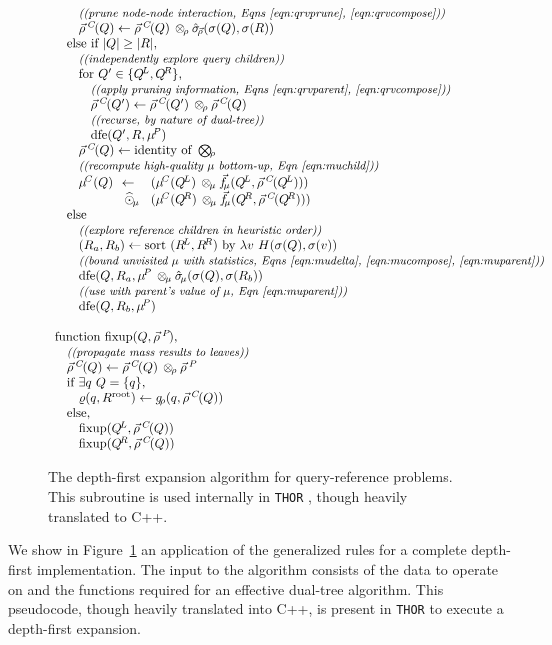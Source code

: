 \documentclass[twoside,leqno,twocolumn]{article}
\newcommand{\THOR}{{{\tt THOR}} }
\newcommand{\com}[1]{{\small \textit{((#1))}}}
\newcommand{\summary}{\hat{\sigma}}
\newcommand{\fig}[1]{Figure~\ref{fig:#1}}
\newcommand{\psty}{}
\newcommand{\X}{\\ \psty}
\newcommand{\x}{\X \hspace{0.13in}}
\newcommand{\xx}{\X \hspace{0.26in}}
\newcommand{\xxx}{\X \hspace{0.39in}}
\newcommand{\kdroot}[1]{#1^{\text{root}}}
\newcommand{\kdleft}[1]{#1^{\!L}}
\newcommand{\kdright}[1]{#1^{\!R}}
\newcommand{\nameOp}[2]{\mathop{#1\nolimits\!\!_{#2}}}
\newcommand{\nameop}[2]{{\scriptstyle\:}#1_{\!#2}}
\newcommand{\myOp}[1]{\nameOp{\bigotimes}{#1}}
\newcommand{\myop}[1]{\nameop{\otimes}{#1}}
\newcommand{\letterqr}{\rho}
\newcommand{\outqr}{\varrho}
\newcommand{\Opqr}{\myOp{\letterqr}}
\newcommand{\opqr}{\myop{\letterqr}}
\newcommand{\gqr}{g_{\!\letterqr}}
\newcommand{\letterqrv}{\vec{\rho}}
\newcommand{\deltaqrv}{\summary_{\!\letterqrv}}
\newcommand{\varqrv}{\letterqrv^{\:C\!}}
\newcommand{\varqrvparent}{\letterqrv^{\:P\!}}
\newcommand{\lettermu}{\mu}
\newcommand{\outopmu}{\:\widehat{\odot}_{\!\mu}\:}
\newcommand{\opmu}{\myop{\lettermu}}
\newcommand{\fmuv}{\vec{f_{\!\lettermu}}}
\newcommand{\deltamu}{\summary_{\!\lettermu}}
\newcommand{\heurqr}{H}
\newcommand{\varmuchild}{\lettermu^{\!C}}
\newcommand{\varmuparent}{\lettermu^{\!P}}
\newcommand{\outstat}{\sigma}
\begin{document}
\begin{figure}
\[\begin{array}[t]{l}
    \xx \text{\com{prune node-node interaction, Eqns \ref{eqn:qrvprune}, \ref{eqn:qrvcompose}}}
    \xx \varqrv(Q) \gets \varqrv(Q) \opqr \deltaqrv(\outstat(Q), \outstat(R))
    \x \text{else if } |Q| \geq |R|\text{,}
    \xx \text{\com{independently explore query children}}
    \xx \text{for } Q' \in \{\kdleft{Q}, \kdright{Q}\}\text{,}
    \xxx \text{\com{apply pruning information, Eqns \ref{eqn:qrvparent}, \ref{eqn:qrvcompose}}}
    \xxx \varqrv(Q') \gets \varqrv(Q') \opqr \varqrv(Q)
    \xxx \text{\com{recurse, by nature of dual-tree}}
    \xxx \text{dfe}(Q', R, \varmuparent)
    \xx \varqrv(Q) \gets \text{identity of }\Opqr
    \xx \text{\com{recompute high-quality $\lettermu$ bottom-up, Eqn~\ref{eqn:muchild}}}
    \xx \!\!\!\begin{array}{lll}
         \psty \varmuchild(Q) &\psty\!\!\gets\!\!&\psty (\varmuchild(\kdleft{Q})  \opmu \fmuv(\kdleft{Q}, \varqrv(\kdleft{Q})))
         \\          &\psty\!\!\outopmu\!\!&\psty (\varmuchild(\kdright{Q}) \opmu \fmuv(\kdright{Q}, \varqrv(\kdright{Q})))
        \end{array}
    \x \text{else}
    \xx \text{\com{explore reference children in heuristic order}}
    \xx (R_a, R_b) \gets \text{sort }(\kdleft{R}, \kdright{R})\text{ by }\lambda v ~ \heurqr(\outstat(Q), \outstat(v))
    \xx \text{\com{bound unvisited $\lettermu$ with statistics, Eqns \ref{eqn:mudelta}, \ref{eqn:mucompose}, \ref{eqn:muparent}}}
    \xx \text{dfe}(Q, R_a, \varmuparent \opmu \deltamu(\outstat(Q), \outstat(R_b))
    \xx \text{\com{use with parent's value of $\lettermu$, Eqn \ref{eqn:muparent}}}
    \xx \text{dfe}(Q, R_b, \varmuparent)
    \X
    \X \text{function fixup}(Q, \varqrvparent)\text{,}
    \x \text{\com{propagate mass results to leaves}}
    \x \varqrv(Q) \gets \varqrv(Q) \opqr \varqrvparent
    \x \text{if } \exists q ~ Q = \{q\}\text{,}
    \xx \outqr(q, \kdroot{R}) \gets \gqr(q, \varqrv(Q))
    \x \text{else,}
    \xx \text{fixup}(\kdleft{Q}, \varqrv(Q))
    \xx \text{fixup}(\kdright{Q}, \varqrv(Q))
  \end{array}
\]
\caption{\label{fig:dfe} The depth-first expansion algorithm for query-reference problems.
This subroutine is used internally in \THOR, though heavily translated to C++.
}
\end{figure}

We show in \fig{dfe} an application of the generalized rules for a complete depth-first implementation.
The input to the algorithm consists of the data to operate on and the functions required for an effective dual-tree algorithm.
This pseudocode, though heavily translated into C++, is present in \THOR to execute a depth-first expansion.
\end{document}
